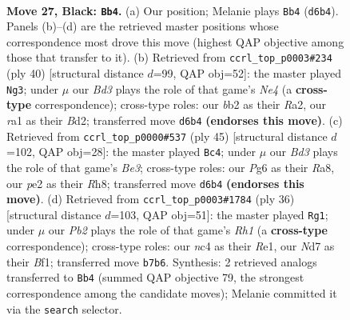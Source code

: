 \documentclass[11pt]{article}
\begin{document}
\clearpage

\begin{figure}[p]\centering
\begin{subfigure}{0.46\textwidth}\centering
\resizebox{\linewidth}{!}{%
\newchessgame
\chessboard[
  setfen={rnb5/1p1n2k1/p2bppp1/3r3p/2N5/1P2P1PP/PBB1PK2/R3R3 b - - 0 27},
  showmover=false,
  pgfstyle=straightmove, color=movearrow, markmove={d6-b4}
]}
\caption{}
\end{subfigure}\hfill
\begin{subfigure}{0.46\textwidth}\centering
\resizebox{\linewidth}{!}{%
\newchessgame
\chessboard[
  setfen={r6r/pp2knb1/2bpp1pp/8/2P1N3/1P1B3P/R2B1PP1/4R1K1 w - - 2 21},
  showmover=false,
  pgfstyle=straightmove, color=movearrow, markmove={e4-g3}
]}
\caption{}
\end{subfigure}
\\[4pt]
\begin{subfigure}{0.46\textwidth}\centering
\resizebox{\linewidth}{!}{%
\newchessgame
\chessboard[
  setfen={r6r/pp4p1/n1nBbkBp/4p3/3p3N/P6P/2P2PP1/4RRK1 b - - 3 23},
  showmover=false,
  pgfstyle=straightmove, color=movearrow, markmove={e6-c4}
]}
\caption{}
\end{subfigure}\hfill
\begin{subfigure}{0.46\textwidth}\centering
\resizebox{\linewidth}{!}{%
\newchessgame
\chessboard[
  setfen={5r1r/pppkn2p/2bpn3/5p2/3P3P/2PN4/PP1N2P1/2K1RB1R w - - 8 19},
  showmover=false,
  pgfstyle=straightmove, color=movearrow, markmove={h1-g1}
]}
\caption{}
\end{subfigure}
\caption{\textbf{Move 27, Black: \texttt{Bb4}.} (a) Our position; Melanie plays \texttt{Bb4} (\texttt{d6b4}). Panels (b)--(d) are the retrieved master positions whose correspondence most drove this move (highest QAP objective among those that transfer to it). (b) Retrieved from \texttt{ccrl\_top\_p0003\#234} (ply 40) [structural distance $d$=99, QAP obj=52]: the master played \texttt{Ng3}; under $\mu$ our \emph{Bd3} plays the role of that game's \emph{Ne4} (a \textbf{cross-type} correspondence); cross-type roles: our \emph{b}b2 as their \emph{R}a2, our \emph{r}a1 as their \emph{B}d2; transferred move \texttt{d6b4} \textbf{(endorses this move)}. (c) Retrieved from \texttt{ccrl\_top\_p0000\#537} (ply 45) [structural distance $d$=102, QAP obj=28]: the master played \texttt{Bc4}; under $\mu$ our \emph{Bd3} plays the role of that game's \emph{Be3}; cross-type roles: our \emph{P}g6 as their \emph{R}a8, our \emph{p}e2 as their \emph{R}h8; transferred move \texttt{d6b4} \textbf{(endorses this move)}. (d) Retrieved from \texttt{ccrl\_top\_p0003\#1784} (ply 36) [structural distance $d$=103, QAP obj=51]: the master played \texttt{Rg1}; under $\mu$ our \emph{Pb2} plays the role of that game's \emph{Rh1} (a \textbf{cross-type} correspondence); cross-type roles: our \emph{n}c4 as their \emph{R}e1, our \emph{N}d7 as their \emph{B}f1; transferred move \texttt{b7b6}. Synthesis: 2 retrieved analogs transferred to \texttt{Bb4} (summed QAP objective 79, the strongest correspondence among the candidate moves); Melanie committed it via the \texttt{search} selector.}
\label{fig:thought-m53}
\end{figure}
\end{document}
